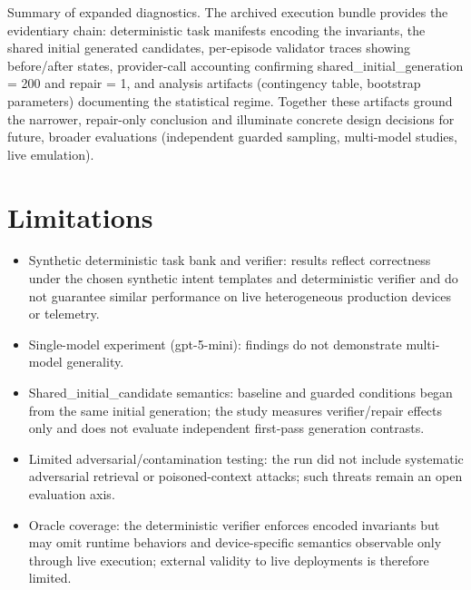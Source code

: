 \documentclass[conference]{IEEEtran}
\begin{document}
Summary of expanded diagnostics. The archived execution bundle provides the evidentiary chain: deterministic task manifests encoding the invariants, the shared initial generated candidates, per-episode validator traces showing before/after states, provider-call accounting confirming shared\_initial\_generation = 200 and repair = 1, and analysis artifacts (contingency table, bootstrap parameters) documenting the statistical regime. Together these artifacts ground the narrower, repair-only conclusion and illuminate concrete design decisions for future, broader evaluations (independent guarded sampling, multi-model studies, live emulation).

\section{Limitations}
\begin{itemize}
\item Synthetic deterministic task bank and verifier: results reflect correctness under the chosen synthetic intent templates and deterministic verifier and do not guarantee similar performance on live heterogeneous production devices or telemetry.
\item Single-model experiment (gpt-5-mini): findings do not demonstrate multi-model generality.
\item Shared\_initial\_candidate semantics: baseline and guarded conditions began from the same initial generation; the study measures verifier/repair effects only and does not evaluate independent first-pass generation contrasts.
\item Limited adversarial/contamination testing: the run did not include systematic adversarial retrieval or poisoned-context attacks; such threats remain an open evaluation axis.
\item Oracle coverage: the deterministic verifier enforces encoded invariants but may omit runtime behaviors and device-specific semantics observable only through live execution; external validity to live deployments is therefore limited.
\end{itemize}
\end{document}
